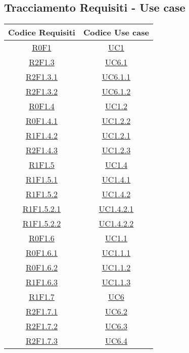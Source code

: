 \subsection{Tracciamento Requisiti - Use case}
\normalsize
\begin{longtable}{|c|c|}
\hline
\textbf{Codice Requisiti} & \textbf{Codice Use case} \\
\hline
\endhead
\hyperlink{R0F1}{R0F1} & \hyperlink{UC1}{UC1}\\
\hline
\hyperlink{R2F1.3}{R2F1.3} & \hyperlink{UC6.1}{UC6.1}\\
\hline
\hyperlink{R2F1.3.1}{R2F1.3.1} & \hyperlink{UC6.1.1}{UC6.1.1}\\
\hline
\hyperlink{R2F1.3.2}{R2F1.3.2} & \hyperlink{UC6.1.2}{UC6.1.2}\\
\hline
\hyperlink{R0F1.4}{R0F1.4} & \hyperlink{UC1.2}{UC1.2}\\
\hline
\hyperlink{R0F1.4.1}{R0F1.4.1} & \hyperlink{UC1.2.2}{UC1.2.2}\\
\hline
\hyperlink{R1F1.4.2}{R1F1.4.2} & \hyperlink{UC1.2.1}{UC1.2.1}\\
\hline
\hyperlink{R2F1.4.3}{R2F1.4.3} & \hyperlink{UC1.2.3}{UC1.2.3}\\
\hline
\hyperlink{R1F1.5}{R1F1.5} & \hyperlink{UC1.4}{UC1.4}\\
\hline
\hyperlink{R1F1.5.1}{R1F1.5.1} & \hyperlink{UC1.4.1}{UC1.4.1}\\
\hline
\hyperlink{R1F1.5.2}{R1F1.5.2} & \hyperlink{UC1.4.2}{UC1.4.2}\\
\hline
\hyperlink{R1F1.5.2.1}{R1F1.5.2.1} & \hyperlink{UC1.4.2.1}{UC1.4.2.1}\\
\hline
\hyperlink{R1F1.5.2.2}{R1F1.5.2.2} & \hyperlink{UC1.4.2.2}{UC1.4.2.2}\\
\hline
\hyperlink{R0F1.6}{R0F1.6} & \hyperlink{UC1.1}{UC1.1}\\
\hline
\hyperlink{R0F1.6.1}{R0F1.6.1} & \hyperlink{UC1.1.1}{UC1.1.1}\\
\hline
\hyperlink{R0F1.6.2}{R0F1.6.2} & \hyperlink{UC1.1.2}{UC1.1.2}\\
\hline
\hyperlink{R1F1.6.3}{R1F1.6.3} & \hyperlink{UC1.1.3}{UC1.1.3}\\
\hline
\hyperlink{R1F1.7}{R1F1.7} & \hyperlink{UC6}{UC6}\\
\hline
\hyperlink{R2F1.7.1}{R2F1.7.1} & \hyperlink{UC6.2}{UC6.2}\\
\hline
\hyperlink{R2F1.7.2}{R2F1.7.2} & \hyperlink{UC6.3}{UC6.3}\\
\hline
\hyperlink{R2F1.7.3}{R2F1.7.3} & \hyperlink{UC6.4}{UC6.4}\\

\end{longtable}

